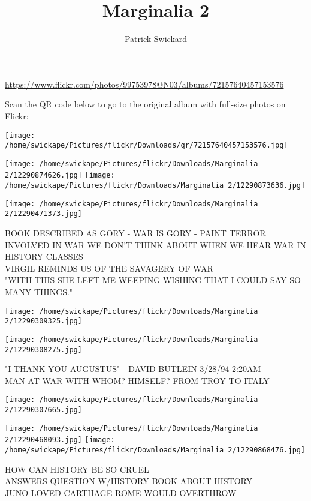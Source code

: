 \documentclass[10pt,letterpaper]{article}
\title{Marginalia 2}
\author{Patrick Swickard}
\date{}
\begin{document}
\maketitle

\url{https://www.flickr.com/photos/99753978@N03/albums/72157640457153576}

Scan the QR code below to go to the original album with full-size photos on Flickr:

\texttt{[image: /home/swickape/Pictures/flickr/Downloads/qr/72157640457153576.jpg]}
\pagebreak

\texttt{[image: /home/swickape/Pictures/flickr/Downloads/Marginalia 2/12290874626.jpg]}
\texttt{[image: /home/swickape/Pictures/flickr/Downloads/Marginalia 2/12290873636.jpg]}

\vspace{0.25in}
\texttt{[image: /home/swickape/Pictures/flickr/Downloads/Marginalia 2/12290471373.jpg]}

BOOK DESCRIBED AS GORY {-} WAR IS GORY {-} PAINT TERROR INVOLVED IN WAR WE DON'T THINK ABOUT WHEN WE HEAR WAR IN HISTORY CLASSES\\
VIRGIL REMINDS US OF THE SAVAGERY OF WAR\\
"WITH THIS SHE LEFT ME WEEPING WISHING THAT I COULD SAY SO MANY THINGS."
\pagebreak

\texttt{[image: /home/swickape/Pictures/flickr/Downloads/Marginalia 2/12290309325.jpg]}

\vspace{0.25in}
\texttt{[image: /home/swickape/Pictures/flickr/Downloads/Marginalia 2/12290308275.jpg]}

"I THANK YOU AUGUSTUS" {-} DAVID BUTLEIN 3/28/94 2:20AM\\
MAN AT WAR WITH WHOM? HIMSELF? FROM TROY TO ITALY
\pagebreak

\texttt{[image: /home/swickape/Pictures/flickr/Downloads/Marginalia 2/12290307665.jpg]}

\vspace{0.25in}
\texttt{[image: /home/swickape/Pictures/flickr/Downloads/Marginalia 2/12290468093.jpg]}
\texttt{[image: /home/swickape/Pictures/flickr/Downloads/Marginalia 2/12290868476.jpg]}

HOW CAN HISTORY BE SO CRUEL\\
ANSWERS QUESTION W/HISTORY BOOK ABOUT HISTORY\\
JUNO LOVED CARTHAGE ROME WOULD OVERTHROW
\pagebreak
\end{document}

